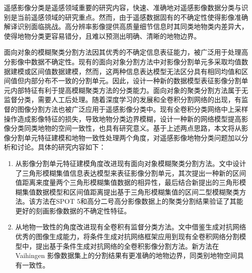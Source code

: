 

\makeatother



\begin{cabstract}
  遥感影像分类是遥感领域重要的研究内容，快速、准确地对遥感影像数据分类与识别是当前遥感领域的研究重点。然而，由于遥感数据固有的不确定性使得影像准确解译识别面临挑战。高分辨率影像提供高质量细节信息时其同类地物类内差异大，使得地物分类更容易错分，且难以预测出明确、清晰的地物边界。

  面向对象的模糊聚类分割方法因其优秀的不确定信息表征能力，被广泛用于处理高分影像中数据不确定性。现有的面向对象分割方法中对影像分割单元多采取均值数据建模或区间值数据建模，然而，这两种信息表达模型无法区分具有相同均值和区间值但内部分布不一致的分割单元。因此，设计一种新的数据模型表征影像分割单元内部特征有利于提高模糊聚类方法的分类能力。面向对象的聚类分割方法属于无监督分类，需要人工后处理。随着深度学习的发展和全卷积分割网络的出现，有监督的图像分割方法也被广泛应用于遥感影像分类中。现有全卷积分类网络中上采样操作造成影像特征的损失，导致地物分类边界模糊，设计一种新的网络模型提高影像分类同类地物的空间一致性，也具有研究意义。基于上述两点思路，本文将从影像分割单元特征建模和地物一致性处理两个角度，对遥感影像地物分类问题加以分析和讨论。具体的研究内容如下：
  \begin{enumerate}[(1)]
    \item 从影像分割单元特征建模角度改进现有面向对象模糊聚类分割方法。文中设计了三角形模糊集值信息表达模型来表征影像分割单元，其次提出一种新的区间值距离来度量两个三角形模糊集值数据的相异性，最后结合新提出的三角形模糊集值数据模型和区间值距离提出基于三角形模糊集值的区间二型模糊聚类方法。该方法在SPOT 5和高分二号高分影像数据上的聚类分割结果验证了其能更好的刻画影像数据的不确定性特征。
    \item 从地物一致性的角度改进现有全卷积有监督分类方法。文中借鉴生成对抗网络优秀的图像生成能力，将条件生成对抗网络框架应用到现有全卷积网络分割模型中，提出基于条件生成对抗网络的全卷积影像分割方法。新方法在Vaihingen 影像数据集上的分割结果有更准确的地物边界，同类别地物空间具有一致性。
  \end{enumerate}
\end{cabstract}

